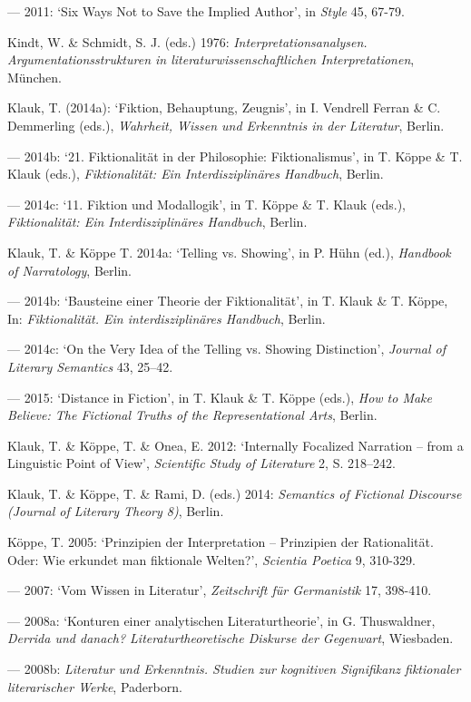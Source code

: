 \begin{hangparas}{.5cm}{1}
--- 2011: `Six Ways Not to Save the Implied Author', in \emph{Style} 45, 67-79.

Kindt, W. \& Schmidt, S. J. (eds.) 1976: \emph{Interpretationsanalysen. Argumentationsstrukturen in literaturwissenschaftlichen Interpretationen}, M\"unchen.

Klauk, T. (2014a): `Fiktion, Behauptung, Zeugnis', in I. Vendrell Ferran \& C. Demmerling (eds.), \emph{Wahrheit, Wissen und Erkenntnis in der Literatur}, Berlin.

--- 2014b: `21. Fiktionalit\"at in der Philosophie: Fiktionalismus', in T. K\"oppe \& T. Klauk (eds.), \emph{Fiktionalit\"at: Ein Interdisziplin\"ares Handbuch}, Berlin.

--- 2014c: `11. Fiktion und Modallogik', in T. K\"oppe \& T. Klauk (eds.), \emph{Fiktionalit\"at: Ein Interdisziplin\"ares Handbuch}, Berlin. 

Klauk, T. \& K\"oppe T. 2014a: `Telling vs. Showing', in P. H\"uhn (ed.), \emph{Handbook of Narratology}, Berlin.

--- 2014b: `Bausteine einer Theorie der Fiktionalit\"at', in T. Klauk \& T. K\"oppe, In: \emph{Fiktionalit\"at. Ein interdisziplin\"ares Handbuch}, Berlin.

--- 2014c: `On the Very Idea of the Telling vs. Showing Distinction', \emph{Journal of Literary Semantics} 43, 25--42.

--- 2015: `Distance in Fiction', in T. Klauk \& T. K\"oppe (eds.), \emph{How to Make Believe: The Fictional Truths of the Representational Arts}, Berlin.

Klauk, T. \& K\"oppe, T. \& Onea, E. 2012: `Internally Focalized Narration -- from a Linguistic Point of View', \emph{Scientific Study of Literature} 2, S. 218--242.

Klauk, T. \& K\"oppe, T. \& Rami, D. (eds.) 2014: \emph{Semantics of Fictional Discourse (Journal of Literary Theory 8)}, Berlin.

K\"oppe, T. 2005: `Prinzipien der Interpretation -- Prinzipien der Rationalit\"at. Oder: Wie erkundet man fiktionale Welten?', \emph{Scientia Poetica} 9, 310-329.

--- 2007: `Vom Wissen in Literatur', \emph{Zeitschrift f\"ur Germanistik} 17, 398-410.

--- 2008a: `Konturen einer analytischen Literaturtheorie', in G. Thuswaldner, \emph{Derrida und danach? Literaturtheoretische Diskurse der Gegenwart}, Wiesbaden.

--- 2008b: \emph{Literatur und Erkenntnis. Studien zur kognitiven Signifikanz fiktionaler literarischer Werke}, Paderborn. 


\end{hangparas}
